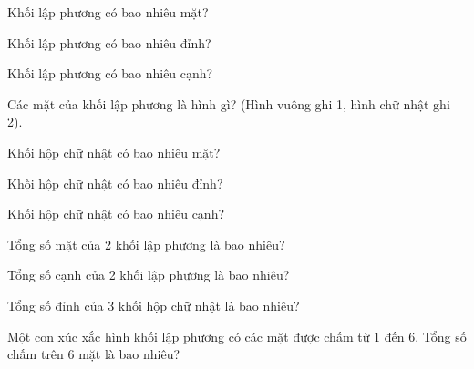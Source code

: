 \begin{ex}
Khối lập phương có bao nhiêu mặt?
\end{ex}

\begin{ex}
Khối lập phương có bao nhiêu đỉnh?
\end{ex}

\begin{ex}
Khối lập phương có bao nhiêu cạnh?
\end{ex}

\begin{ex}
Các mặt của khối lập phương là hình gì? (Hình vuông ghi 1, hình chữ nhật ghi 2).
\end{ex}

\begin{ex}
Khối hộp chữ nhật có bao nhiêu mặt?
\end{ex}

\begin{ex}
Khối hộp chữ nhật có bao nhiêu đỉnh?
\end{ex}

\begin{ex}
Khối hộp chữ nhật có bao nhiêu cạnh?
\end{ex}

\begin{ex}
Tổng số mặt của 2 khối lập phương là bao nhiêu?
\end{ex}

\begin{ex}
Tổng số cạnh của 2 khối lập phương là bao nhiêu?
\end{ex}

\begin{ex}
Tổng số đỉnh của 3 khối hộp chữ nhật là bao nhiêu?
\end{ex}

\begin{ex}
Một con xúc xắc hình khối lập phương có các mặt được chấm từ 1 đến 6. Tổng số chấm trên 6 mặt là bao nhiêu?
\end{ex}

